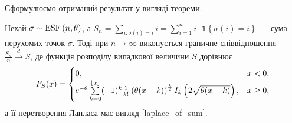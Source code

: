 Сформулюємо отриманий результат у вигляді теореми.
\begin{theorem}\label{th:sum_limit}
    Нехай $\sigma \sim \ESF{n, \theta}$, а 
    $S_n = \sum_{i : \sigma(i) = i} i = \sum_{i=1}^n i \cdot \mathds{1}\left\{\sigma(i) = i \right\}$ --- сума нерухомих точок $\sigma$.
    Тоді при $n\to\infty$ виконується граничне
    співвідношення
    $\frac{S_n}{n} \overset{d}{\longrightarrow} S$,
    де функція розподілу випадкової величини $S$ дорівнює
    \begin{gather}
        F_{S}(x) = \begin{cases}
            0, & x < 0, \\
            e^{-\theta}
            \sum\limits_{k=0}^{\floor*{x}}
            (-1)^k \frac{1}{k!}\left(\theta(x-k)\right)^{\frac{k}{2}} I_k\left(2\sqrt{\theta(x-k)}\right), & x \geq 0,
        \end{cases}
    \end{gather}
    а її перетворення Лапласа має вигляд \eqref{laplace_of_sum}.
    

\end{theorem}
